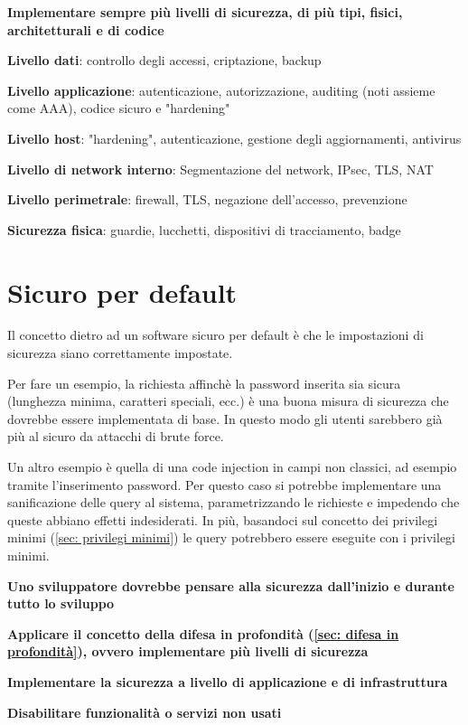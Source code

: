 \documentclass[11pt,a4paper]{book}
\begin{document}
\textbf{Implementare sempre più livelli di sicurezza, di più tipi, fisici, architetturali e di codice}

\textbf{Livello dati}: controllo degli accessi, criptazione, backup

\textbf{Livello applicazione}: autenticazione, autorizzazione, auditing (noti assieme come AAA), codice sicuro e "hardening"

\textbf{Livello host}: "hardening", autenticazione, gestione degli aggiornamenti, antivirus

\textbf{Livello di network interno}: Segmentazione del network, IPsec, TLS, NAT

\textbf{Livello perimetrale}: firewall, TLS, negazione dell'accesso, prevenzione

\textbf{Sicurezza fisica}: guardie, lucchetti, dispositivi di tracciamento, badge
\section{Sicuro per default}\label{sec: sicuro per default}
Il concetto dietro ad un software sicuro per default è che le impostazioni di sicurezza siano correttamente impostate.

Per fare un esempio, la richiesta affinchè la password inserita sia sicura (lunghezza minima, caratteri speciali, ecc.) è una buona misura di sicurezza che dovrebbe essere implementata di base. In questo modo gli utenti sarebbero già più al sicuro da attacchi di brute force.

Un altro esempio è quella di una code injection in campi non classici, ad esempio tramite l'inserimento password. Per questo caso si potrebbe implementare una sanificazione delle query al sistema, parametrizzando le richieste e impedendo che queste abbiano effetti indesiderati. In più, basandoci sul concetto dei privilegi minimi (\ref{sec: privilegi minimi}) le query potrebbero essere eseguite con i privilegi minimi.

\textbf{Uno sviluppatore dovrebbe pensare alla sicurezza dall'inizio e durante tutto lo sviluppo}

\textbf{Applicare il concetto della difesa in profondità (\ref{sec: difesa in profondità}), ovvero implementare più livelli di sicurezza}

\textbf{Implementare la sicurezza a livello di applicazione e di infrastruttura}

\textbf{Disabilitare funzionalità o servizi non usati}
\end{document}
